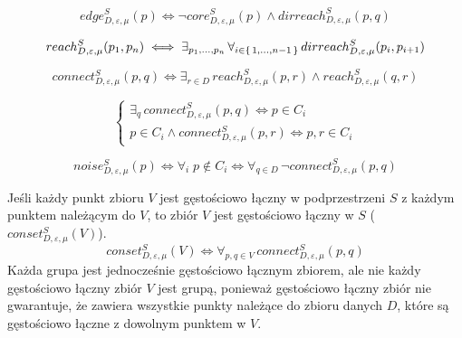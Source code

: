\begin{equation}
	edge^S_{D,\varepsilon,\mu}(p) \iff \neg core^S_{D,\varepsilon,\mu}(p) \land dirreach^S_{D,\varepsilon,\mu}(p,q)
\end{equation}

\begin{equation}
	reach^S_{D,\varepsilon,\mu}(p_1, p_n)	\iff 	\exists_{p_1,\dots,p_n}\,\forall_{i\in\set{1,\dots,n-1}}\,dirreach^S_{D,\varepsilon,\mu}(p_i, p_{i+1}) 
\end{equation}

\begin{equation}
connect^S_{D,\varepsilon,\mu}(p, q) \iff \exists_{r\in D}\,reach^S_{D,\varepsilon,\mu}(p, r) \land reach^S_{D,\varepsilon,\mu}(q, r)
\end{equation}

\begin{equation}
	\left\{
	\begin{array}{l}
		\exists_q\,connect^S_{D,\varepsilon,\mu}(p,q) \iff p\in C_i \\
		p \in C_i \land connect^S_{D,\varepsilon,\mu}(p,r) \iff p,r\in C_i 
	\end{array}
	\right.
\end{equation}


\begin{equation}
	noise^S_{D,\varepsilon,\mu}(p) \iff \forall_i \;p\notin C_i \iff \forall_{q \in D} \,\neg connect^S_{D,\varepsilon,\mu}(p,q)
\end{equation}

\newline
Jeśli każdy punkt zbioru $ V $ jest gęstościowo łączny w podprzestrzeni $ S $ z każdym punktem należącym do $ V $, to zbiór $ V $ jest gęstościowo łączny w $ S $ ($ conset^S_{D,\varepsilon, \mu}(V) $).
\begin{equation}
	conset^S_{D,\varepsilon, \mu}(V) \iff \forall_{p,q\in V}\,connect^S_{D,\varepsilon, \mu}(p,q)
\end{equation}
Każda grupa jest jednocześnie gęstościowo łącznym zbiorem, ale nie każdy gęstościowo łączny zbiór $ V $ jest grupą, ponieważ gęstościowo łączny zbiór nie gwarantuje, że zawiera wszystkie punkty należące do zbioru danych $ D $, które są gęstościowo łączne z dowolnym punktem w $ V $.
\smallskip

